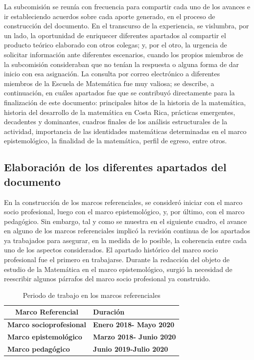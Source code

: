 La subcomisión se reunía con frecuencia para compartir cada uno de los avances e ir estableciendo acuerdos sobre cada aporte generado, en el proceso de construcción del documento. En el transcurso de la experiencia, se vislumbra, por un lado, la oportunidad de enriquecer diferentes apartados al compartir el producto teórico elaborado con otros colegas; y, por el otro, la urgencia de solicitar información ante diferentes escenarios, cuando los propios miembros de la subcomisión consideraban que no tenían la respuesta o alguna forma de dar inicio con esa asignación. La consulta por correo electrónico a diferentes miembros de la Escuela de Matemática fue muy valiosa; se describe, a continuación, en cuáles apartados fue que se contribuyó directamente para la finalización de este documento: principales hitos de la historia de la matemática, historia del desarrollo de la matemática en Costa Rica, prácticas emergentes, decadentes y dominantes, cuadros finales de los análisis estructurales de la actividad, importancia de las identidades matemáticas determinadas en el marco epistemológico, la finalidad de la matemática, perfil de egreso, entre otros.

\subsection{Elaboración de los diferentes apartados del documento}

En la construcción de los marcos referenciales, se consideró iniciar con el marco socio profesional, luego con el marco epistemológico, y, por último, con el marco pedagógico. Sin embargo, tal y como se muestra en el siguiente cuadro, el avance en alguno de los marcos referenciales implicó la revisión continua de los apartados ya trabajados para asegurar, en la medida de lo posible, la coherencia entre cada uno de los aspectos considerados. El apartado histórico del marco socio profesional fue el primero en trabajarse. Durante la redacción del objeto de estudio de la Matemática en el marco epistemológico, surgió la necesidad de reescribir algunos párrafos del marco socio profesional ya construido.  

\begin{table}[H]
\begin{center}
\begin{tabular}{|ll|}
\hline
\multicolumn{1}{|c|}{\cellcolor[HTML]{00C0F3} \textbf{Marco Referencial}} &
\multicolumn{1}{l|}{\cellcolor[HTML]{00C0F3} \textbf{Duración}} \\ \hline
\multicolumn{1}{|l|}{\textbf{Marco socioprofesional}} & \multicolumn{1}{l|}{ \textbf{Enero 2018- Mayo 2020}} \\ \hline
\multicolumn{1}{|l|}{\textbf{Marco epistemológico}} & \multicolumn{1}{l|}{ \textbf{Marzo 2018- Junio 2020}} \\ \hline
\multicolumn{1}{|l|}{\textbf{Marco pedagógico}} & \multicolumn{1}{l|}{ \textbf{Junio 2019-Julio 2020}} \\ \hline
\end{tabular}
\end{center}
\caption{Periodo de trabajo en los marcos referenciales}
\end{table}


